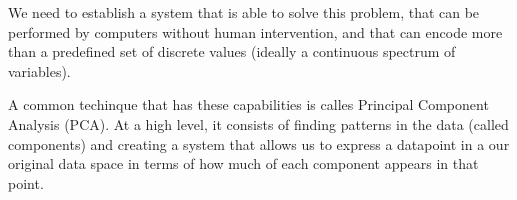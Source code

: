 \documentclass[12pt]{report}
\begin{document}
            We need to establish a system that is able to solve this problem, that can be performed by computers without human intervention, and that can encode more than a predefined set of discrete values (ideally a continuous spectrum of variables).

            A common techinque that has these capabilities is calles Principal Component Analysis (PCA). At a high level, it consists of finding patterns in the data (called components) and creating a system that allows us to express a datapoint in a our original data space in terms of how much of each component appears in that point.


            
\end{document}
